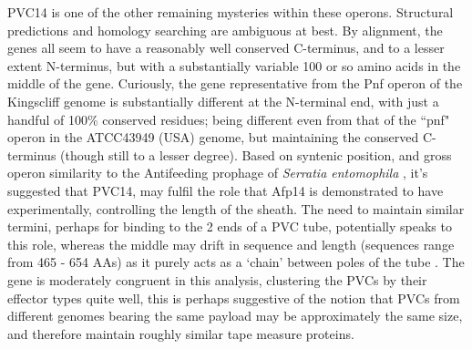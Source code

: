 PVC14 is one of the other remaining mysteries within these operons. Structural predictions and homology searching are ambiguous at best. By alignment, the genes all seem to have a reasonably well conserved C-terminus, and to a lesser extent N-terminus, but with a substantially variable 100 or so amino acids in the middle of the gene. Curiously, the gene representative from the Pnf operon of the Kingscliff genome is substantially different at the N-terminal end, with just a handful of 100\% conserved residues; being different even from that of the ``pnf" operon in the ATCC43949 (USA) genome, but maintaining the conserved C-terminus (though still to a lesser degree). Based on syntenic position, and gross operon similarity to the Antifeeding prophage of \emph{Serratia entomophila} \citep{Heymann2013}, it's suggested that PVC14, may fulfil the role that Afp14 is demonstrated to have experimentally, controlling the length of the sheath. The need to maintain similar termini, perhaps for binding to the 2 ends of a PVC tube, potentially speaks to this role, whereas the middle may drift in sequence and length (sequences range from 465 - 654 AAs) as it purely acts as a `chain' between poles of the tube \citep{Rybakova2015a}. The gene is moderately congruent in this analysis, clustering the PVCs by their effector types quite well, this is perhaps suggestive of the notion that PVCs from different genomes bearing the same payload may be approximately the same size, and therefore maintain roughly similar tape measure proteins.
 
